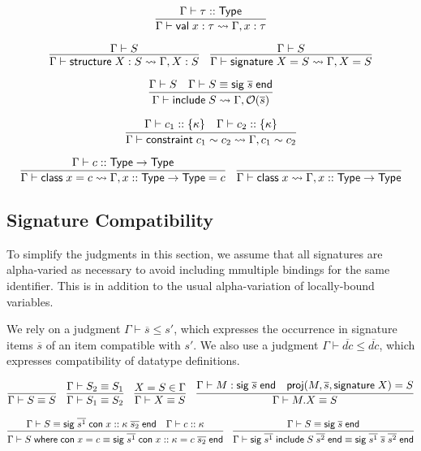 \documentclass{article}
\newcommand{\mt}[1]{\mathsf{#1}}
\begin{document}
$$\infer{\Gamma \vdash \mt{val} \; x : \tau \leadsto \Gamma, x : \tau}{
  \Gamma \vdash \tau :: \mt{Type}
}$$

$$\infer{\Gamma \vdash \mt{structure} \; X : S \leadsto \Gamma, X : S}{
  \Gamma \vdash S
}
\quad \infer{\Gamma \vdash \mt{signature} \; X = S \leadsto \Gamma, X = S}{
  \Gamma \vdash S
}$$

$$\infer{\Gamma \vdash \mt{include} \; S \leadsto \Gamma, \mathcal O(\overline{s})}{
  \Gamma \vdash S
  & \Gamma \vdash S \equiv \mt{sig} \; \overline{s} \; \mt{end}
}$$

$$\infer{\Gamma \vdash \mt{constraint} \; c_1 \sim c_2 \leadsto \Gamma, c_1 \sim c_2}{
  \Gamma \vdash c_1 :: \{\kappa\}
  & \Gamma \vdash c_2 :: \{\kappa\}
}$$

$$\infer{\Gamma \vdash \mt{class} \; x = c \leadsto \Gamma, x :: \mt{Type} \to \mt{Type} = c}{
  \Gamma \vdash c :: \mt{Type} \to \mt{Type}
}
\quad \infer{\Gamma \vdash \mt{class} \; x \leadsto \Gamma, x :: \mt{Type} \to \mt{Type}}{}$$

\subsection{Signature Compatibility}

To simplify the judgments in this section, we assume that all signatures are alpha-varied as necessary to avoid including mmultiple bindings for the same identifier.  This is in addition to the usual alpha-variation of locally-bound variables.

We rely on a judgment $\Gamma \vdash \overline{s} \leq s'$, which expresses the occurrence in signature items $\overline{s}$ of an item compatible with $s'$.  We also use a judgment $\Gamma \vdash \overline{dc} \leq \overline{dc}$, which expresses compatibility of datatype definitions.

$$\infer{\Gamma \vdash S \equiv S}{}
\quad \infer{\Gamma \vdash S_1 \equiv S_2}{
  \Gamma \vdash S_2 \equiv S_1
}
\quad \infer{\Gamma \vdash X \equiv S}{
  X = S \in \Gamma
}
\quad \infer{\Gamma \vdash M.X \equiv S}{
  \Gamma \vdash M : \mt{sig} \; \overline{s} \; \mt{end}
  & \mt{proj}(M, \overline{s}, \mt{signature} \; X) = S
}$$

$$\infer{\Gamma \vdash S \; \mt{where} \; \mt{con} \; x = c \equiv \mt{sig} \; \overline{s^1} \; \mt{con} \; x :: \kappa = c \; \overline{s_2} \; \mt{end}}{
  \Gamma \vdash S \equiv \mt{sig} \; \overline{s^1} \; \mt{con} \; x :: \kappa \; \overline{s_2} \; \mt{end}
  & \Gamma \vdash c :: \kappa
}
\quad \infer{\Gamma \vdash \mt{sig} \; \overline{s^1} \; \mt{include} \; S \; \overline{s^2} \; \mt{end} \equiv \mt{sig} \; \overline{s^1} \; \overline{s} \; \overline{s^2} \; \mt{end}}{
  \Gamma \vdash S \equiv \mt{sig} \; \overline{s} \; \mt{end}
}$$
\end{document}
